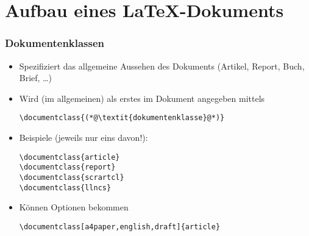 
\subtitle{Einführung}
\date{Sommersemester 2017}





\section{Aufbau eines \LaTeX-Dokuments}




\begin{frame}[fragile]
  \frametitle{Dokumentenklassen}

  \onslide<+->

  \begin{itemize}
  \item<+-> Spezifiziert das allgemeine Aussehen des Dokuments (Artikel, Report, Buch,
    Brief, \dots)
  \item<+-> Wird (im allgemeinen) als erstes im Dokument angegeben mittels
\begin{lstlisting}
\documentclass{(*@\textit{dokumentenklasse}@*)}
\end{lstlisting}
  \item<+-> Beispiele (jeweils nur eins davon!):
\begin{lstlisting}
\documentclass{article}
\documentclass{report}
\documentclass{scrartcl}
\documentclass{llncs}
\end{lstlisting}
  \item<+-> Können Optionen bekommen
\begin{lstlisting}
\documentclass[a4paper,english,draft]{article}
\end{lstlisting}

  \end{itemize}

\end{frame}

